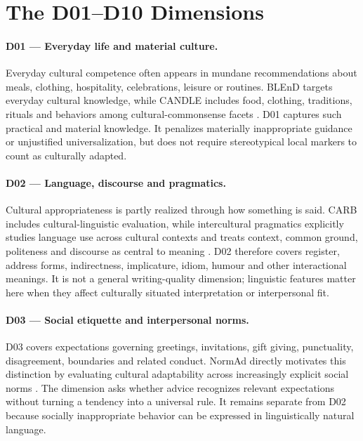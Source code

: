 

\section{The D01--D10 Dimensions}
\label{sec:dimensions}

\paragraph{D01 --- Everyday life and material culture.}
Everyday cultural competence often appears in mundane recommendations about meals, clothing, hospitality, celebrations, leisure or routines. BLEnD targets everyday cultural knowledge, while CANDLE includes food, clothing, traditions, rituals and behaviors among cultural-commonsense facets \parencite{myung2024blend,nguyen2023candle}. D01 captures such practical and material knowledge. It penalizes materially inappropriate guidance or unjustified universalization, but does not require stereotypical local markers to count as culturally adapted.

\paragraph{D02 --- Language, discourse and pragmatics.}
Cultural appropriateness is partly realized through how something is said. CARB includes cultural-linguistic evaluation, while intercultural pragmatics explicitly studies language use across cultural contexts and treats context, common ground, politeness and discourse as central to meaning \parencite{zhang2026carb,kecskes2014intercultural}. D02 therefore covers register, address forms, indirectness, implicature, idiom, humour and other interactional meanings. It is not a general writing-quality dimension; linguistic features matter here when they affect culturally situated interpretation or interpersonal fit.

\paragraph{D03 --- Social etiquette and interpersonal norms.}
D03 covers expectations governing greetings, invitations, gift giving, punctuality, disagreement, boundaries and related conduct. NormAd directly motivates this distinction by evaluating cultural adaptability across increasingly explicit social norms \parencite{rao2025normad}. The dimension asks whether advice recognizes relevant expectations without turning a tendency into a universal rule. It remains separate from D02 because socially inappropriate behavior can be expressed in linguistically natural language.


